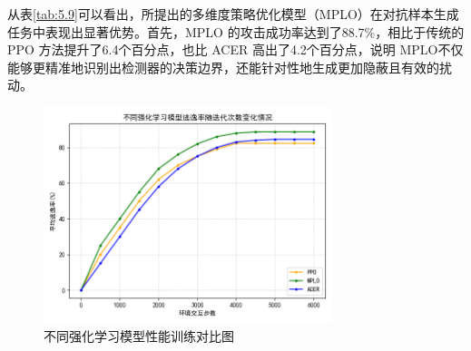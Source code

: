 
从表\ref{tab:5.9}可以看出，所提出的多维度策略优化模型（MPLO）在对抗样本生成任务中表现出显著优势。首先，MPLO 的攻击成功率达到了88.7\%，相比于传统的PPO 方法提升了6.4个百分点，也比 ACER 高出了4.2个百分点，说明 MPLO不仅能够更精准地识别出检测器的决策边界，还能针对性地生成更加隐蔽且有效的扰动。

\begin{figure}[hbt]
	\centering
	\includegraphics[width=0.75\textwidth]{figures/5.1}
	\caption{不同强化学习模型性能训练对比图}\label{fig:5.1}
\end{figure}

